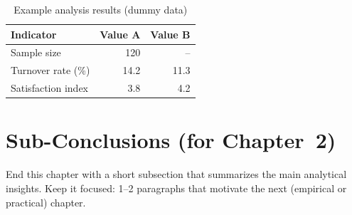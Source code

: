{\singlespacing
\begin{table}[h]
  \caption{Example analysis results (dummy data)}
  \label{tab:analysis-results}
  \centering
  \begin{tabular}{lrr}
    \toprule
    Indicator & Value A & Value B\\
    \midrule
    Sample size         & 120 & -- \\
    Turnover rate (\%)  & 14.2 & 11.3\\
    Satisfaction index  & 3.8 & 4.2\\
    \bottomrule
  \end{tabular}
\end{table}
}

\section{Sub-Conclusions (for Chapter~2)}
End this chapter with a short subsection that summarizes the main analytical insights. Keep it focused: 1–2 paragraphs that motivate the next (empirical or practical) chapter.